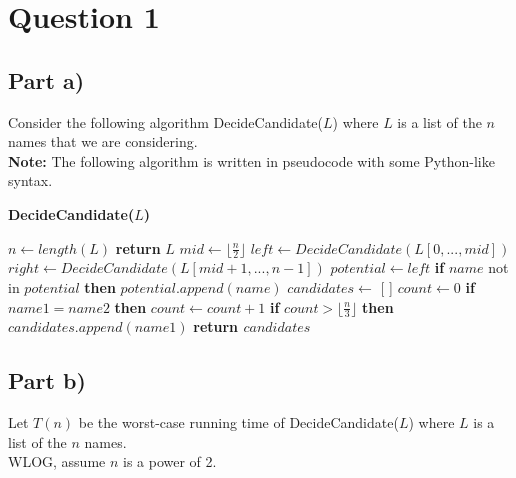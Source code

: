 \documentclass[12pt]{article}
\begin{document}
\setlength\parindent{0pt}

\section*{Question 1}

\subsection*{Part a)}

Consider the following algorithm DecideCandidate($L$) where $L$ is a list of the $n$ names that we are considering. \\

\textbf{Note:} The following algorithm is written in pseudocode with some Python-like syntax. 

\begin{algorithm}[hbt!]
\caption{\textbf{DecideCandidate($L$)}}\label{alg:cap}
\begin{algorithmic}[1]
\State $n \gets length(L)$ 
    \State \textbf{return} $L$
\EndIf
\State
\State $mid \gets \lfloor \frac{n}{2} \rfloor$
\State $left \gets DecideCandidate(L[0,...,mid])$ 
\State $right \gets DecideCandidate(L[mid+1,...,n-1])$ 
\State
\State $potential \gets left$ 
    \State \textbf{if} $name$ not in $potential$ \textbf{then} $potential.append(name)$
\EndFor
\State
\State $candidates \gets $ [ ] 
    \State $count \gets 0$
        \State \textbf{if} $name1 = name2$ \textbf{then} $count \gets count + 1$
    \EndFor
    \State \textbf{if} $count > \lfloor \frac{n}{3} \rfloor$ \textbf{then} $candidates.append(name1)$
\EndFor
\State
\State \textbf{return $candidates$}
\end{algorithmic}
\end{algorithm}


\subsection*{Part b)}

Let $T(n)$ be the worst-case running time of DecideCandidate($L$) where $L$ is a list of the $n$ names. \\

WLOG, assume $n$ is a power of 2. \\
\end{document}
